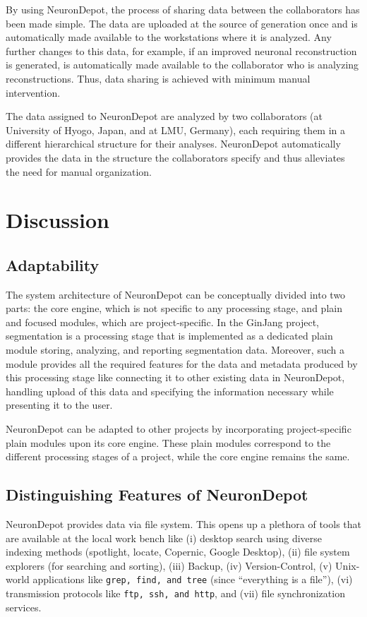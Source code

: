 \documentclass{frontiersSCNS} %
\begin{document}
By using NeuronDepot, the process of sharing data between the collaborators has
been made simple. The data are uploaded at the source of generation once and is
automatically made available to the workstations where it is analyzed. Any
further changes to this data, for example, if an improved neuronal
reconstruction is generated, is automatically made available to the
collaborator who is analyzing reconstructions. Thus, data sharing is achieved
with minimum manual intervention.

The data assigned to NeuronDepot are analyzed by two collaborators (at
University of Hyogo, Japan, and at LMU, Germany), each requiring them in a
different hierarchical structure for their analyses. NeuronDepot automatically
provides the data in the structure the collaborators specify and thus
alleviates the need for manual organization.

\section{Discussion}

\subsection{Adaptability}
The system architecture of NeuronDepot can be conceptually divided into two
parts: the core engine, which is not specific to any processing stage, and
plain and focused modules, which are project-specific. In the GinJang project,
segmentation is a processing stage that is implemented as a dedicated plain
module storing, analyzing, and reporting segmentation data. Moreover, such a
module provides all the required features for the data and metadata produced by
this processing stage like connecting it to other existing data in
NeuronDepot, handling upload of this data and specifying the information
necessary while presenting it to the user.

NeuronDepot can be adapted to other projects by incorporating project-specific
plain modules upon its core engine. These plain modules correspond to the
different processing stages of a project, while the core engine
remains the same.

\subsection{Distinguishing Features of NeuronDepot}

NeuronDepot provides data via file system. This opens up a plethora of tools
that are available at the local work bench like (i) desktop search using
diverse indexing methods (spotlight, locate, Copernic, Google Desktop),
(ii) file system explorers (for searching and sorting), (iii) Backup, (iv)
Version-Control, (v) Unix-world applications like \texttt{grep, find, and tree}
(since ``everything is a file''), (vi) transmission protocols like \texttt{ftp,
ssh, and http}, and (vii) file synchronization services.
\end{document}
